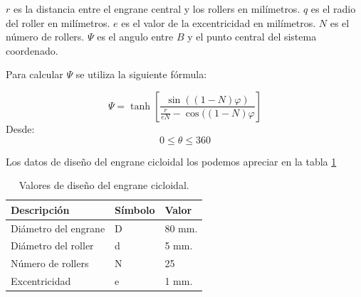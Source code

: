 $r$ es la distancia entre el engrane central y los rollers en milímetros.
$q$ es el radio del roller en milímetros.
$e$ es el valor de la excentricidad en milímetros.
$N$ es el número de rollers.
$\Psi$ es el angulo entre $B$ y el punto central del sistema coordenado.

Para calcular $\Psi$ se utiliza la siguiente fórmula:

\begin{equation}
\Psi = \tanh \left[ \frac{\sin((1-N)\varphi)}{\frac{r}{eN}-\cos((1-N)\varphi} \right]
\end{equation}
Desde:
$$
0 \leq \theta \leq 360
$$

Los datos de diseño del engrane cicloidal los podemos apreciar en la tabla \ref{table:valorescicloidal}

\begin{table}
\centering
\caption{Valores de diseño del engrane cicloidal.}
\label{table:valorescicloidal}
\begin{tabular}{l|l|l|}
\textbf{Descripción} & \textbf{Símbolo} & \textbf{Valor}  \\ 
\hline
Diámetro del engrane & D                & 80 mm.          \\
Diámetro del roller  & d                & 5 mm.           \\
Número de rollers    & N                & 25              \\
Excentricidad        & e                & 1 mm.          
\end{tabular}
\end{table}

  